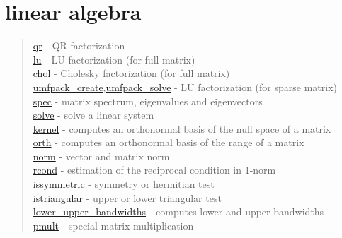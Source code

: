 \chapter*{linear algebra}

\begin{quote}
\noindent
\hyperlink{qr}{qr} - QR factorization\\
\hyperlink{lu}{lu} - LU factorization (for full matrix) \\
\hyperlink{chol}{chol} - Cholesky factorization (for full matrix) \\
\hyperlink{umfpack_create}{umfpack\_create},\hyperlink{umfpack_solve}{umfpack\_solve}
- LU factorization (for sparse matrix) \\
\hyperlink{spec}{spec} - matrix spectrum, eigenvalues and eigenvectors\\
\hyperlink{solve}{solve} - solve a linear system\\
\hyperlink{kernel}{kernel} - computes an orthonormal basis of the null space of a matrix\\
\hyperlink{orth}{orth} - computes an orthonormal basis of the range of a matrix\\
\hyperlink{norm}{norm} - vector and matrix norm\\
\hyperlink{rcond}{rcond} - estimation of the reciprocal condition in 1-norm\\
\hyperlink{issymmetric}{issymmetric} - symmetry or hermitian test\\
\hyperlink{istriangular}{istriangular} - upper or lower triangular test\\
\hyperlink{lower_upper_bandwidths}{lower\_upper\_bandwidths} - computes lower and upper bandwidths\\
\hyperlink{pmult}{pmult} - special matrix multiplication\\
\end{quote}

 
 
 
 
 


 
 
 
 


